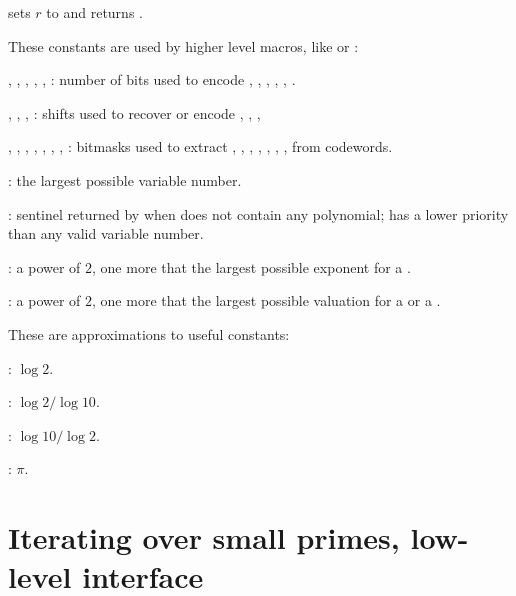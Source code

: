 
 sets $r$ to 
and returns .


These constants are used by higher level macros, like  or :

\noindent {},
,
,
,
,
:
number of bits used to encode , , ,
, , .

\noindent {},
,
,
: shifts used to recover or encode , ,
, 

\noindent {},
,
,
,
,
,
,
: bitmasks used to extract , , ,
, , , ,  from 
codewords.

\noindent {}: the largest possible variable number.

\noindent {}:  sentinel returned by  when 
does not contain any polynomial; has a lower priority than any valid variable
number.

\noindent {}: a power of $2$, one more that the largest possible
exponent for a .

\noindent {}: a power of $2$, one more that the largest possible
valuation for a  or a .


These are  approximations to useful constants:

\noindent {}: $\log 2$.

\noindent {}: $\log 2 / \log 10$.

\noindent {}: $\log 10 / \log 2$.

\noindent {}: $\pi$.

\section{Iterating over small primes, low-level interface}
\label{se:primetable}

